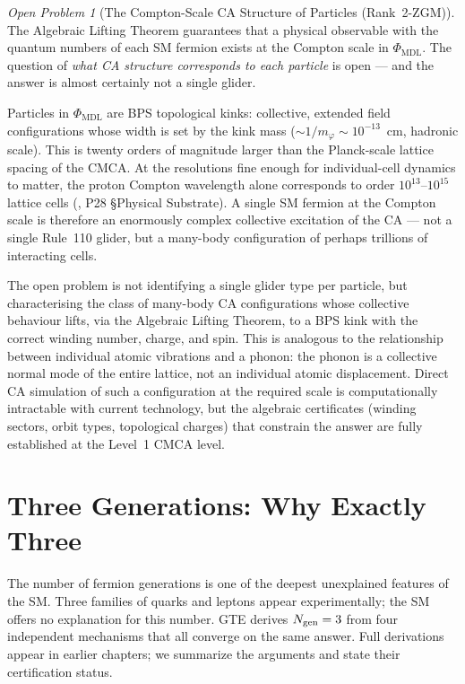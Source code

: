 \documentclass[11pt,openany]{book}
\theoremstyle{remark}
\newtheorem{openprob}{Open Problem}[chapter]
\newcommand{\PHIMDL}{\Phi_{\mathrm{MDL}}}
\newcommand{\Ngen}{N_{\rm gen}}
\begin{document}
\begin{openprob}[The Compton-Scale CA Structure of Particles (Rank~2-ZGM)]
\label{oprob:glider_fermion}
The Algebraic Lifting Theorem guarantees that a physical observable with the quantum
numbers of each SM fermion exists at the Compton scale in $\PHIMDL$.
The question of \emph{what CA structure corresponds to each particle} is open ---
and the answer is almost certainly not a single glider.

Particles in $\PHIMDL$ are BPS topological kinks: collective, extended field configurations
whose width is set by the kink mass ($\sim\!1/m_\varphi \sim 10^{-13}$~cm, hadronic scale).
This is twenty orders of magnitude larger than the Planck-scale lattice spacing of the CMCA.
At the resolutions fine enough for individual-cell dynamics to matter, the proton Compton
wavelength alone corresponds to order $10^{13}$--$10^{15}$ lattice cells
(\cite{SpivackCompUniversality}, P28 §Physical Substrate).
A single SM fermion at the Compton scale is therefore an enormously complex collective
excitation of the CA --- not a single Rule~110 glider, but a many-body configuration of
perhaps trillions of interacting cells.

The open problem is not identifying a single glider type per particle, but characterising the
class of many-body CA configurations whose collective behaviour lifts, via the Algebraic
Lifting Theorem, to a BPS kink with the correct winding number, charge, and spin.
This is analogous to the relationship between individual atomic vibrations and a phonon:
the phonon is a collective normal mode of the entire lattice, not an individual atomic
displacement.  Direct CA simulation of such a configuration at the required scale is
computationally intractable with current technology, but the algebraic certificates
(winding sectors, orbit types, topological charges) that constrain the answer are fully
established at the Level~1 CMCA level.
\end{openprob}

\section{Three Generations: Why Exactly Three}
\label{sec:three_gen}

The number of fermion generations is one of the deepest unexplained features of the SM.
Three families of quarks and leptons appear experimentally; the SM offers no explanation
for this number.  GTE derives $\Ngen = 3$ from four independent mechanisms that all
converge on the same answer.  Full derivations appear in earlier chapters; we summarize
the arguments and state their certification status.
\end{document}
